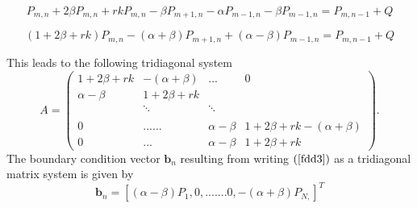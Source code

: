 \documentclass[12pt]{article}
\numberwithin{equation}{subsection} %
\begin{document}
  \begin{equation*}
P_{m,n}+2\beta P_{m,n}+rkP_{m,n}-\beta P_{m+1,n}-\alpha
P_{m-1,n}-\beta P_{m-1,n}=P_{m,n-1}+Q
 \end{equation*}

 \begin{equation}\label{fdd3}
(1+2\beta
+rk)P_{m,n}-(\alpha+\beta)P_{m+1,n}+(\alpha-\beta)P_{m-1,n}=P_{m,n-1}+Q
 \end{equation}

This leads to the following tridiagonal system
\[A = \left( \begin{array}{cccc}
1+2\beta +rk& -(\alpha+\beta) & ...& 0\\
\alpha-\beta & 1+2\beta +rk &  & \\
& \ddots & \ddots &  \\
& & &  \\
 0&......& \alpha-\beta&1+2\beta+rk  -(\alpha+\beta) \\
 0 &...&\alpha-\beta & 1+2\beta
+rk \end{array} \right) .\] The boundary condition vector
$\textbf{b}_n$  resulting from  writing $(\ref{fdd3})$ as a
tridiagonal matrix system is given by
\begin{equation*}
\textbf{b}_n=  \left[
(\alpha-\beta)P_{1},0,.......0,-(\alpha+\beta)P_{N,}\right]^{T}
 \end{equation*}
\end{document}
